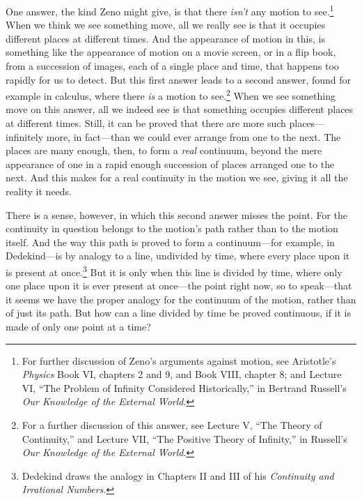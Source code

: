 \documentclass[12pt]{memoir}
\begin{document}
One answer, the kind Zeno might give, is that
there \emph{isn't} any motion to see.\footnote{For
further discussion of Zeno's arguments against
motion, see Aristotle's \emph{Physics} Book VI,
chapters 2 and 9, and Book VIII, chapter 8; and
Lecture VI, ``The Problem of Infinity Considered
Historically,'' in Bertrand Russell's \emph{Our
Knowledge of the External World}.} When we think
we see something move, all we really see is
that it occupies different places at different
times. And the appearance of motion in this, is
something like the appearance of motion on a movie
screen, or in a flip book, from a succession of
images, each of a single place and time, that
happens too rapidly for us to detect. But this
first answer leads to a second answer, found for
example in calculus, where there \emph{is} a
motion to see.\footnote{For a further discussion
of this answer, see Lecture V, ``The Theory of
Continuity,'' and Lecture VII, ``The Positive
Theory of Infinity,'' in Russell's \emph{Our
Knowledge of the External World}.} When we see
something move on this answer, all we indeed see
is that something occupies different places at
different times. Still, it can be proved that
there are more such places---infinitely more, in
fact---than we could ever arrange from one to the
next. The places are many enough, then, to form a
\emph{real} continuum, beyond the mere appearance
of one in a rapid enough succession of places
arranged one to the next. And this makes for a
real continuity in the motion we see, giving it
all the reality it needs.

There is a sense, however, in which this second
answer misses the point. For the continuity in
question belongs to the motion's path rather
than to the motion itself. And the way this path
is proved to form a continuum---for example, in
Dedekind---is by analogy to a line, undivided
by time, where every place upon it is present
at once.\footnote{Dedekind draws the analogy in
Chapters II and III of his \emph{Continuity and
Irrational Numbers}.} But it is only when this
line is divided by time, where only one place upon
it is ever present at once---the point right now,
so to speak---that it seems we have the proper
analogy for the continuum of the motion, rather
than of just its path. But how can a line divided
by time be proved continuous, if it is made of
only one point at a time?
\end{document}

